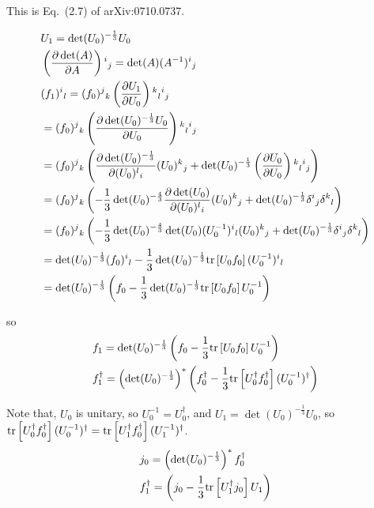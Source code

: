 This is Eq.~(2.7) of arXiv:0710.0737.


\begin{equation}
\begin{split}
&U_1 = \det (U_0)^{-\frac{1}{3}}U_0\\
&\left(\frac{\partial \det(A)}{\partial A}\right){}^i{}_j = \det (A) (A^{-1}){}^i{}_j\\
&(f_1){}^i{}_l = (f_0){}^j{}_k \left(\frac{\partial U_1}{\partial U_0}\right){}^k{}_l{}^i{}_j \\
&= (f_0){}^j{}_k \left(\frac{\partial \det (U_0)^{-\frac{1}{3}}U_0}{\partial U_0}\right){}^k{}_l{}^i{}_j \\
&= (f_0){}^j{}_k \left(\frac{\partial \det (U_0)^{-\frac{1}{3}}}{\partial (U_0){}^l{}_i}(U_0){}^k{}_j + \det (U_0)^{-\frac{1}{3}} \left(\frac{\partial U_0}{\partial U_0}\right){}^k{}_l{}^i{}_j\right) \\
&= (f_0){}^j{}_k \left(-\frac{1}{3}\det (U_0)^{-\frac{4}{3}}\frac{\partial \det (U_0)}{\partial (U_0){}^l{}_i}(U_0){}^k{}_j + \det (U_0)^{-\frac{1}{3}} \delta{}^i{}_j{}\delta ^k{}_l\right) \\
&= (f_0){}^j{}_k \left(-\frac{1}{3}\det (U_0)^{-\frac{4}{3}}\det (U_0) (U_0^{-1}){}^i{}_l(U_0){}^k{}_j + \det (U_0)^{-\frac{1}{3}} \delta{}^i{}_j{}\delta ^k{}_l\right) \\
&= \det (U_0)^{-\frac{1}{3}}(f_0){}^i{}_l-\frac{1}{3}\det (U_0)^{-\frac{1}{3}} {\rm tr}\left[U_0f_0\right] (U_0^{-1}){}^i{}_l\\
&=\det (U_0)^{-\frac{1}{3}}\left(f_0 -\frac{1}{3}\det (U_0)^{-\frac{1}{3}} {\rm tr}\left[U_0f_0\right]U_0^{-1}\right)\\
\end{split}
\end{equation}

so
\begin{equation}
\begin{split}
&f_1=\det (U_0)^{-\frac{1}{3}}\left(f_0 -\frac{1}{3}{\rm tr}\left[U_0f_0\right]U_0^{-1}\right)\\
&f_1^{\dagger}=\left(\det (U_0)^{-\frac{1}{3}}\right)^* \left(f_0^{\dagger} -\frac{1}{3}{\rm tr}\left[U_0^{\dagger}f_0^{\dagger}\right](U_0^{-1})^{\dagger}\right)\\
\end{split}
\end{equation}

Note that, $U_0$ is unitary, so $U_0^{-1}=U_0^{\dagger}$, and $U_1 = \det (U_0)^{-\frac{1}{3}}U_0$, so ${\rm tr}\left[U_0^{\dagger}f_0^{\dagger}\right](U_0^{-1})^{\dagger}={\rm tr}\left[U_1^{\dagger}f_0^{\dagger}\right](U_1^{-1})^{\dagger}$.
\begin{equation}
\begin{split}
&j_0=\left(\det (U_0)^{-\frac{1}{3}}\right)^* f_0^{\dagger}\\
&f_1^{\dagger}=\left(j_0 -\frac{1}{3}{\rm tr}\left[U_1^{\dagger}j_0\right]U_1\right)\\
\end{split}
\end{equation}

